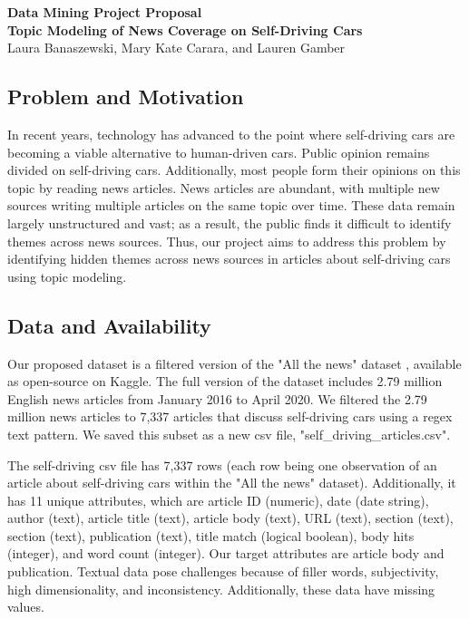 \documentclass{article}
\begin{document}
\begin{center}
    {\Large\bfseries Data Mining Project Proposal}\\[6pt]
    {\large \bfseries Topic Modeling of News Coverage on Self-Driving Cars} \\[6pt]
    { \large Laura Banaszewski, Mary Kate Carara, and Lauren Gamber}\\[2pt]
\end{center}


\subsection*{Problem and Motivation}
In recent years, technology has advanced to the point where self-driving cars are becoming a viable alternative to human-driven cars. Public opinion remains divided on self-driving cars. Additionally, most people form their opinions on this topic by reading news articles. News articles are abundant, with multiple new sources writing multiple articles on the same topic over time. These data remain largely unstructured and vast; as a result, the public finds it difficult to identify themes across news sources. Thus, our project aims to address this problem by identifying hidden themes across news sources in articles about self-driving cars using topic modeling.       


\subsection*{Data and Availability}
Our proposed dataset is a filtered version of the "All the news" dataset \parencite{mckinley2021}, available as open-source on Kaggle. The full version of the dataset includes 2.79 million English news articles from January 2016 to April 2020. We filtered the 2.79 million news articles to 7,337 articles that discuss self-driving cars using a regex text pattern. We saved this subset as a new csv file, "self\_driving\_articles.csv". 

The self-driving csv file has 7,337 rows (each row being one observation of an article about self-driving cars within the "All the news" dataset). Additionally, it has 11 unique attributes, which are article ID (numeric), date (date string), author (text), article title (text), article body (text), URL (text), section (text), section (text), publication (text), title match (logical boolean), body hits (integer), and word count (integer). Our target attributes are article body and publication. Textual data pose challenges because of filler words, subjectivity, high dimensionality, and inconsistency. Additionally, these data have missing values. 
\end{document}
